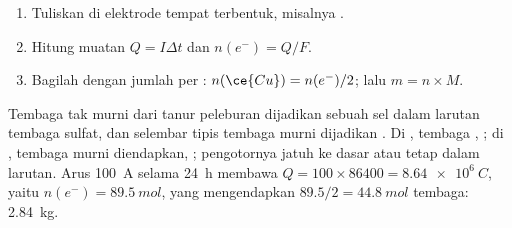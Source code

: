 \begin{method}\label{met:g12:cells-and-electrolysis:mass}
\begin{enumerate}
  \item Tuliskan  di elektrode tempat  terbentuk,
        misalnya .
  \item Hitung muatan $Q = I \Delta t$ dan $n(e^-) = Q/F$.
  \item Bagilah dengan jumlah  per : $n(\ce{Cu}) =
        n(e^-)/2$; lalu $m = n \times M$.
\end{enumerate}
\end{method}


\begin{example}\label{ex:g12:cells-and-electrolysis:refining}
Tembaga tak murni dari tanur peleburan dijadikan  sebuah sel
 dalam larutan tembaga sulfat, dan selembar tipis tembaga
murni dijadikan . Di , tembaga ,
; di , tembaga murni diendapkan,
; pengotornya jatuh ke dasar atau tetap dalam
larutan. Arus \qty{100}{A} selama \qty{24}{h} membawa
$Q = 100 \times 86400 = \qty{8.64e6}{C}$, yaitu
$n(e^-) = \qty{89.5}{mol}$, yang mengendapkan
$89.5/2 = \qty{44.8}{mol}$ tembaga: \qty{2.84}{kg}.
\end{example}

